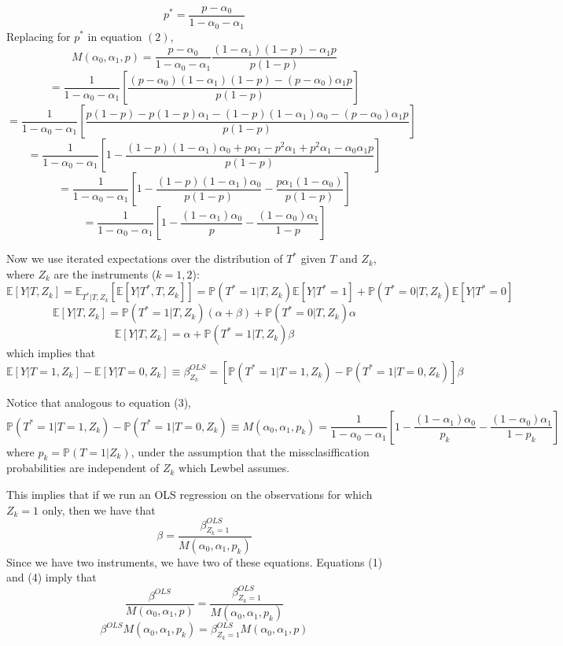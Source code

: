 \[
p^{*}=\frac{p-\alpha_{0}}{1-\alpha_{0}-\alpha_{1}}
\]
Replacing for $p^{*}$ in equation $(2)$, 
\[
M(\alpha_{0},\alpha_{1},p)=\frac{p-\alpha_{0}}{1-\alpha_{0}-\alpha_{1}}\frac{(1-\alpha_{1})(1-p)-\alpha_{1}p}{p(1-p)}
\]
\[
=\frac{1}{1-\alpha_{0}-\alpha_{1}}\left[\frac{(p-\alpha_{0})(1-\alpha_{1})(1-p)-(p-\alpha_{0})\alpha_{1}p}{p(1-p)}\right]
\]
\[
=\frac{1}{1-\alpha_{0}-\alpha_{1}}\left[\frac{p(1-p)-p(1-p)\alpha_{1}-(1-p)(1-\alpha_{1})\alpha_{0}-(p-\alpha_{0})\alpha_{1}p}{p(1-p)}\right]
\]
\[
=\frac{1}{1-\alpha_{0}-\alpha_{1}}\left[1-\frac{(1-p)(1-\alpha_{1})\alpha_{0}+p\alpha_{1}-p^{2}\alpha_{1}+p^{2}\alpha_{1}-\alpha_{0}\alpha_{1}p}{p(1-p)}\right]
\]
\[
=\frac{1}{1-\alpha_{0}-\alpha_{1}}\left[1-\frac{(1-p)(1-\alpha_{1})\alpha_{0}}{p(1-p)}-\frac{p\alpha_{1}(1-\alpha_{0})}{p(1-p)}\right]
\]
\begin{equation}
=\frac{1}{1-\alpha_{0}-\alpha_{1}}\left[1-\frac{(1-\alpha_{1})\alpha_{0}}{p}-\frac{(1-\alpha_{0})\alpha_{1}}{1-p}\right]
\end{equation}


Now we use iterated expectations over the distribution of $T^{*}$
given $T$ and $Z_{k}$, where $Z_{k}$ are the instruments ($k=1,2$):
\[
\mathbb{E}[Y|T,Z_{k}]=\mathbb{E}_{T^{*}|T,Z_{k}}\left[\mathbb{E}[Y|T^{*},T,Z_{k}]\right]=\mathbb{P}(T^{*}=1|T,Z_{k})\mathbb{E}[Y|T^{*}=1]+\mathbb{P}(T^{*}=0|T,Z_{k})\mathbb{E}[Y|T^{*}=0]
\]
\[
\mathbb{E}[Y|T,Z_{k}]=\mathbb{P}(T^{*}=1|T,Z_{k})(\alpha+\beta)+\mathbb{P}(T^{*}=0|T,Z_{k})\alpha
\]
\[
\mathbb{E}[Y|T,Z_{k}]=\alpha+\mathbb{P}(T^{*}=1|T,Z_{k})\beta
\]
which implies that
\[
\mathbb{E}[Y|T=1,Z_{k}]-\mathbb{E}[Y|T=0,Z_{k}]\equiv\beta_{Z_{k}}^{OLS}=\left[\mathbb{P}(T^{*}=1|T=1,Z_{k})-\mathbb{P}(T^{*}=1|T=0,Z_{k})\right]\beta
\]


Notice that analogous to equation (3), 
\[
\mathbb{P}(T^{*}=1|T=1,Z_{k})-\mathbb{P}(T^{*}=1|T=0,Z_{k})\equiv M(\alpha_{0},\alpha_{1},p_{k})=\frac{1}{1-\alpha_{0}-\alpha_{1}}\left[1-\frac{(1-\alpha_{1})\alpha_{0}}{p_{k}}-\frac{(1-\alpha_{0})\alpha_{1}}{1-p_{k}}\right]
\]
where $p_{k}=\mathbb{P}(T=1|Z_{k})$, under the assumption that the
missclasiffication probabilities are independent of $Z_{k}$ which
Lewbel assumes.

This implies that if we run an OLS regression on the observations
for which $Z_{k}=1$ only, then we have that 
\begin{equation}
\beta=\frac{\beta_{Z_{k}=1}^{OLS}}{M(\alpha_{0},\alpha_{1},p_{k})}
\end{equation}
Since we have two instruments, we have two of these equations. Equations
(1) and (4) imply that 
\[
\frac{\beta^{OLS}}{M(\alpha_{0},\alpha_{1},p)}=\frac{\beta_{Z_{k}=1}^{OLS}}{M(\alpha_{0},\alpha_{1},p_{k})}
\]
\[
\beta^{OLS}M(\alpha_{0},\alpha_{1},p_{k})=\beta_{Z_{k}=1}^{OLS}M(\alpha_{0},\alpha_{1},p)
\]


